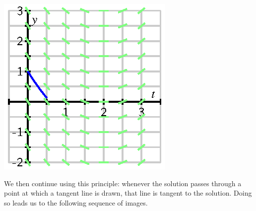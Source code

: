 \begin{center}
  \includegraphics{figures/7_2_field_30.eps}
\end{center}

We then continue using this principle:  whenever the solution passes
through a point at which a tangent line is drawn, that line is tangent
to the solution.  Doing so leads us to the following sequence of images.

